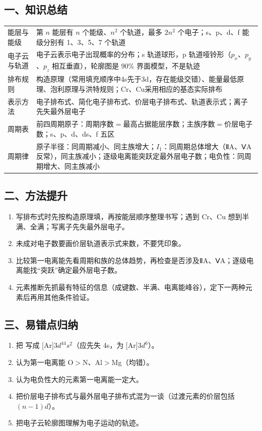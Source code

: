 \subsection*{一、知识总结}
\begin{center}
\small
\begin{tabularx}{\linewidth}{p{2.4cm}X}
\toprule
能层与能级 & 第 $n$ 能层有 $n$ 个能级、$n^2$ 个轨道，最多 $2n^2$ 个电子；s、p、d、f 能级分别有 1、3、5、7 个轨道 \\
电子云与轨道 & 电子云表示电子出现概率的分布；s 轨道球形，p 轨道哑铃形（$p_x$、$p_y$、$p_z$ 相互垂直），轮廓图是 90\% 界面模型，不是轨迹 \\
排布规则 & 构造原理（常用填充顺序中4s先于3d，存在能级交错）、能量最低原理、泡利原理与洪特规则；Cr、Cu采用相应的基态实际排布 \\
表示方法 & 电子排布式、简化电子排布式、价层电子排布式、轨道表示式；离子先失最外层电子 \\
周期表 & 前四周期原子：周期序数$=$最高占据能层序数；主族序数$=$价层电子数；s、p、d、ds、f 五区 \\
周期律 & 原子半径：同周期减小、同主族增大；$I_1$：同周期总体增大（ⅡA、ⅤA 反常），同主族减小；逐级电离能突跃定最外层电子数；电负性：同周期增大、同主族减小 \\
\bottomrule
\end{tabularx}
\end{center}
\subsection*{二、方法提升}
\begin{enumerate}
\item 写排布式时先按构造原理填，再按能层顺序整理书写；遇到 Cr、Cu 想到半满、全满；写离子先失最外层电子。
\item 未成对电子数要画价层轨道表示式来数，不要凭印象。
\item 比较第一电离能先看周期和族的总体趋势，再检查是否涉及ⅡA、ⅤA；逐级电离能找“突跃”确定最外层电子数。
\item 元素推断先抓最有特征的信息（成键数、半满、电离能峰谷），定下一两种元素后再用其他条件验证。
\end{enumerate}
\subsection*{三、易错点归纳}
\begin{enumerate}
\item 把  写成 [Ar]$3d^44s^2$（应先失 4s，为 [Ar]$3d^6$）。
\item 认为第一电离能 O$>$N、Al$>$Mg（均错）。
\item 认为电负性大的元素第一电离能一定大。
\item 把价层电子排布式与最外层电子排布式混为一谈（过渡元素的价层包括 $(n-1)d$）。
\item 把电子云轮廓图理解为电子运动的轨迹。
\end{enumerate}

